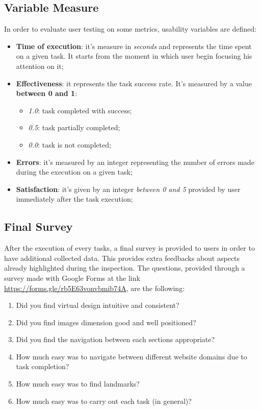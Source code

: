 \subsection{Variable Measure}
In order to evaluate user testing on some metrics, usability variables are defined:
\begin{itemize}
\item \textbf{Time of execution}: it's measure in \textit{seconds} and represents the time spent on a given task. It starts from the moment in which user begin focusing his attention on it;
\item \textbf{Effectiveness}: it represents the task success rate. It's measured by a value \textbf{between 0 and 1}:
    \begin{itemize} 
    \item \textit{1.0}: task completed with success;
    \item \textit{0.5}: task partially completed;
    \item \textit{0.0}: task is not completed;
    \end{itemize}
\item \textbf{Errors}: it's measured by an integer representing the number of errors made during the execution on a given task;
\item \textbf{Satisfaction}: it's given by an integer \textit{between 0 and 5} provided by user immediately after the task execution;
\end{itemize}


\subsection{Final Survey}
After the execution of every tasks, a final survey is provided to users in order to have additional collected data. This provides extra feedbacks about aspects already highlighted during the inspection.
The questions, provided through a survey made with Google Forms at the link \url{https://forms.gle/rb5E63vonvbmib74A}, are the following:
\begin{enumerate}
\item Did you find virtual design intuitive and consistent?
\item Did you find images dimension good and well positioned?
\item Did you find the navigation between each sections appropriate?
\item How much easy was to navigate between different website domains due to task completion?
\item How much easy was to find landmarks?
\item How much easy was to carry out each task (in general)?
\end{enumerate}

